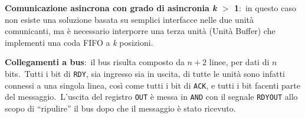 \textbf{Comunicazione asincrona con grado di asincronia \textit{k} $>$ 1}:\ in questo caso non esiste una soluzione basata su semplici interfacce nelle due unità comunicanti, ma è necessario interporre una terza unità (Unità Buffer) che implementi una coda FIFO a \textit{k} posizioni.

\textbf{Collegamenti a bus}:\ il bus risulta composto da $n +2$ linee, per dati di $n$ bits.\
Tutti i bit di \texttt{RDY}, sia ingresso sia in uscita, di tutte le unità sono infatti connessi a una singola linea, così come tutti i bit di \texttt{ACK}, e tutti i bit facenti parte del messaggio.\
L'uscita del registro \texttt{OUT} è messa in \texttt{AND} con il segnale \texttt{RDYOUT} allo scopo di ``ripulire'' il bus dopo che il messaggio è stato ricevuto.

